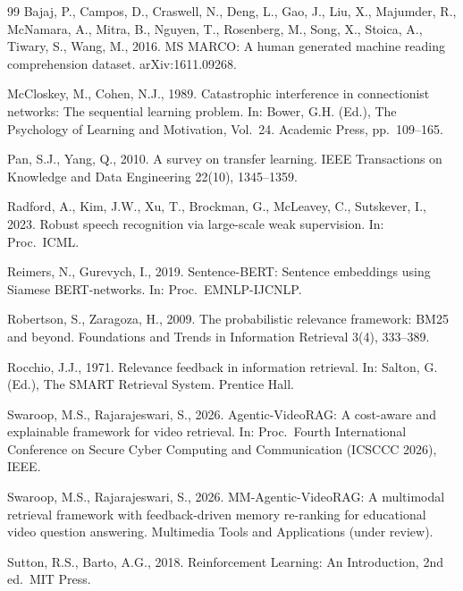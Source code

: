 \documentclass[preprint,12pt]{elsarticle}
\begin{document}
\begin{thebibliography}{99}
Bajaj, P., Campos, D., Craswell, N., Deng, L., Gao, J., Liu, X., Majumder, R.,
McNamara, A., Mitra, B., Nguyen, T., Rosenberg, M., Song, X., Stoica, A.,
Tiwary, S., Wang, M., 2016.
MS MARCO: A human generated machine reading comprehension dataset.
arXiv:1611.09268.

McCloskey, M., Cohen, N.J., 1989.
Catastrophic interference in connectionist networks: The sequential learning
problem. In: Bower, G.H. (Ed.), The Psychology of Learning and Motivation,
Vol.\ 24. Academic Press, pp.\ 109--165.

Pan, S.J., Yang, Q., 2010.
A survey on transfer learning.
IEEE Transactions on Knowledge and Data Engineering 22(10), 1345--1359.

Radford, A., Kim, J.W., Xu, T., Brockman, G., McLeavey, C., Sutskever, I.,
2023.
Robust speech recognition via large-scale weak supervision.
In: Proc.\ ICML.

Reimers, N., Gurevych, I., 2019.
Sentence-BERT: Sentence embeddings using Siamese BERT-networks.
In: Proc.\ EMNLP-IJCNLP.

Robertson, S., Zaragoza, H., 2009.
The probabilistic relevance framework: BM25 and beyond.
Foundations and Trends in Information Retrieval 3(4), 333--389.

Rocchio, J.J., 1971.
Relevance feedback in information retrieval.
In: Salton, G. (Ed.), The SMART Retrieval System. Prentice Hall.

Swaroop, M.S., Rajarajeswari, S., 2026.
Agentic-VideoRAG: A cost-aware and explainable framework for video retrieval.
In: Proc.\ Fourth International Conference on Secure Cyber Computing and
Communication (ICSCCC 2026), IEEE.

Swaroop, M.S., Rajarajeswari, S., 2026.
MM-Agentic-VideoRAG: A multimodal retrieval framework with feedback-driven
memory re-ranking for educational video question answering.
Multimedia Tools and Applications (under review).

Sutton, R.S., Barto, A.G., 2018.
Reinforcement Learning: An Introduction, 2nd ed.\ MIT Press.


\end{thebibliography}
\end{document}
